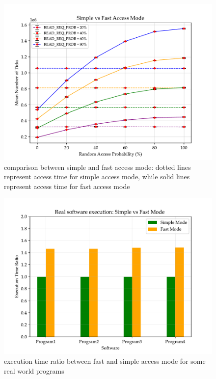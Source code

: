 \documentclass[a4paper,12pt]{article}
\begin{document}
\begin{figure}
  \includegraphics[width=\textwidth]{img/test-simple-vs-fast.pdf}
  \caption{comparison between simple and fast access mode: dotted lines represent access time for simple access mode, while solid lines represent access time for fast access mode}
  \label{fig:test-simple-vs-fast}
\end{figure}

\begin{figure}
  \includegraphics[width=\textwidth]{img/flow.pdf}
  \caption{execution time ratio between fast and simple access mode for some real world programs}
  \label{fig:flow}
\end{figure}
\end{document}
